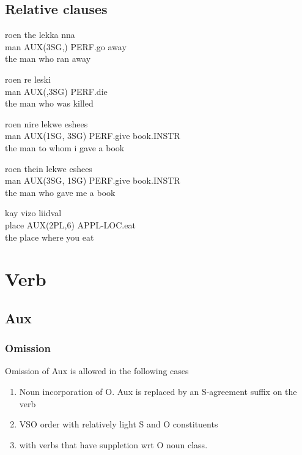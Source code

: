 \documentclass[8pt]{book}
\begin{document}
\section{Relative clauses}

\begin{exe}
\ex
\gll roen the lekka nna \\
 man AUX(3SG,) PERF.go away \\
\trans the man who ran away

\ex
\gll roen re leski \\
man AUX(,3SG) PERF.die \\
\trans the man who was killed


\ex
\gll roen nire lekwe eshees \\
man AUX(1SG, 3SG) PERF.give book.INSTR \\
\trans the man to whom i gave a book

\ex
\gll roen thein lekwe eshees \\
man AUX(3SG, 1SG) PERF.give book.INSTR \\
\trans the man who gave me a book

\ex
\gll kay vizo liidval \\
place AUX(2PL,6) APPL-LOC.eat \\
\trans the place where you eat
\end{exe}



\chapter{Verb}

\section{Aux}

\subsection{Omission}
Omission of Aux is allowed in the following cases
\begin{enumerate}
	\item Noun incorporation of O. Aux is replaced by an S-agreement suffix on the verb
	\item VSO order with relatively light S and O constituents
	\item with verbs that have suppletion wrt O noun class.
\end{enumerate}
\end{document}
